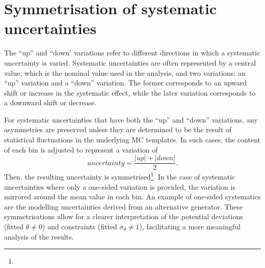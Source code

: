 \section{Symmetrisation of systematic uncertainties}
\label{sec:ChaptH:Systematics:Sym}
The ``up'' and ``down' variations refer to different directions in which a systematic uncertainty is varied.
Systematic uncertainties are often represented by a central value, which is the nominal value used in 
the analysis, and two variations: an ``up'' variation and a ``down'' variation. The former
corresponds to an upward shift or increase in the systematic effect, while the later variation corresponds 
to a downward shift or decrease. 

For systematic uncertainties that have both the ``up'' and ``down'' variations, any asymmetries are 
preserved unless they are determined to be the result of statistical fluctuations in the underlying MC 
templates. In such cases, the content of each bin is adjusted to represent a variation of
\begin{equation*}
	uncertainty = \frac{|up| + |down|}{2}.
\end{equation*}
Then, the resulting uncertainty is symmetrised\footnote{}. 
In the case of systematic uncertainties where only a one-sided variation is provided, 
the variation is mirrored around the mean value in each bin. 
An example of one-sided systematics are the modelling uncertainties derived 
from an alternative generator.
These symmetrisations allow for a clearer interpretation of the potential deviations (fitted 
$\theta \neq 0$) and constraints (fitted $\sigma{_\theta} \neq 1$), facilitating a more meaningful analysis 
of the results. 





